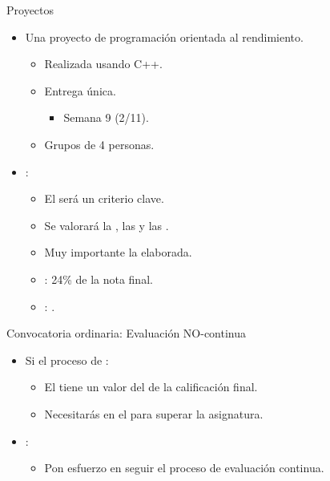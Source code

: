 \begin{frame}[t]{Proyectos}
\begin{itemize}
  \item Una proyecto de programación orientada al rendimiento.
    \begin{itemize}
      \item Realizada usando C++.
      \item Entrega única.
        \begin{itemize}
          \item Semana 9 (2/11).
        \end{itemize}
      \item Grupos de 4 personas.
    \end{itemize}

  \item {}:
    \begin{itemize}
      \item El  será un criterio clave.
      \item Se valorará la , las 
             y las .
      \item Muy importante la  elaborada.
      \item {}: 24\% de la nota final.
      \item {}: .
    \end{itemize}
\end{itemize}
\end{frame}


\begin{frame}[t]{Convocatoria ordinaria: Evaluación NO-continua}
\begin{itemize}
  \item Si  el proceso de :
    \begin{itemize}
      \item El  tiene un valor del 
             de la calificación final.
      \item Necesitarás  en el  
            para superar la asignatura.
    \end{itemize}

  \item {}:
    \begin{itemize}
      \item Pon esfuerzo en seguir el proceso de evaluación continua.
    \end{itemize}
\end{itemize}
\end{frame}


